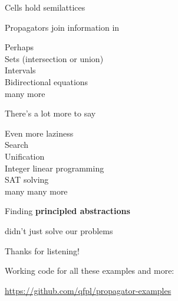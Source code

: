 \documentclass[UKenglish,usenames,dvipsnames,svgnames,table,aspectratio=169,mathserif]{beamer}
\newcommand{\nl}{\vspace{\baselineskip}}
\begin{document}
\begin{frame}
\LARGE \centering

Cells hold semilattices

Propagators join information in
\end{frame}


\begin{frame}

\centering
\Large
Perhaps \\
Sets (intersection or union) \\
Intervals \\
Bidirectional equations \\
many more
\end{frame}


\begin{frame}

\centering \LARGE
There's a lot more to say
\end{frame}


\begin{frame}

\centering
\Large
Even more laziness \\
Search \\
Unification \\
Integer linear programming \\
SAT solving \\
many many more
\end{frame}


\begin{frame}
\centering \LARGE

Finding {\bf principled abstractions}

didn't just solve our problems
\end{frame}


\begin{frame}
\huge \centering
Thanks for listening!
\nl

\large
Working code for all these examples and more:

\url{https://github.com/qfpl/propagator-examples}

\end{frame}
\end{document}

